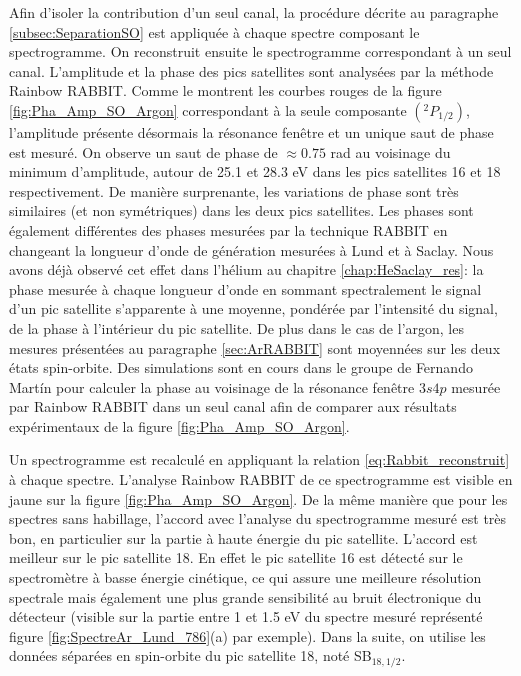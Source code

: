 Afin d'isoler la contribution d'un seul canal, la procédure décrite au paragraphe \ref{subsec:SeparationSO} est appliquée à chaque spectre composant le spectrogramme. On reconstruit ensuite le spectrogramme correspondant à un seul canal. L'amplitude et la phase des pics satellites sont analysées par la méthode Rainbow RABBIT. Comme le montrent les courbes rouges de la figure \ref{fig:Pha_Amp_SO_Argon} correspondant à la seule composante $(^{2}P_{1/2})$, l'amplitude présente désormais la résonance fenêtre et un unique saut de phase est mesuré. On observe un saut de phase de $\approx 0.75$ rad au voisinage du minimum d'amplitude, autour de 25.1 et 28.3 eV dans les pics satellites 16 et 18 respectivement. De manière surprenante, les variations de phase sont très similaires (et non symétriques) dans les deux pics satellites. Les phases sont également différentes des phases mesurées par la technique RABBIT en changeant la longueur d'onde de génération mesurées à Lund  et à Saclay. Nous avons déjà observé cet effet dans l'hélium au chapitre \ref{chap:HeSaclay_res}: la phase mesurée à chaque longueur d'onde en sommant spectralement le signal d'un pic satellite s'apparente à une moyenne, pondérée par l'intensité du signal, de la phase à l'intérieur du pic satellite. De plus dans le cas de l'argon, les mesures présentées au paragraphe \ref{sec:ArRABBIT} sont moyennées sur les deux états spin-orbite. Des simulations sont en cours dans le groupe de Fernando Mart\'{i}n pour calculer la phase au voisinage de la résonance fenêtre $3s4p$ mesurée par Rainbow RABBIT dans un seul canal afin de comparer aux résultats expérimentaux de la figure \ref{fig:Pha_Amp_SO_Argon}.

Un spectrogramme est recalculé en appliquant la relation \ref{eq:Rabbit_reconstruit} à chaque spectre. L'analyse Rainbow RABBIT de ce spectrogramme est visible en jaune sur la figure \ref{fig:Pha_Amp_SO_Argon}. De la même manière que pour les spectres sans habillage, l'accord avec l'analyse du spectrogramme mesuré est très bon, en particulier sur la partie à haute énergie du pic satellite. L'accord est meilleur sur le pic satellite 18. En effet le pic satellite 16 est détecté sur le spectromètre à basse énergie cinétique, ce qui assure une meilleure résolution spectrale mais également une plus grande sensibilité au bruit électronique du détecteur (visible sur la partie entre 1 et 1.5 eV du spectre mesuré représenté figure \ref{fig:SpectreAr_Lund_786}(a) par exemple). Dans la suite, on utilise les données séparées en spin-orbite du pic satellite 18, noté SB$_{18,1/2}$.

